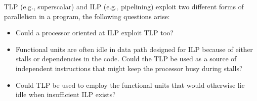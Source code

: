 TLP (e.g., superscalar) and ILP (e.g., pipelining) exploit two different forms of parallelism in a program, the
following questions arise:
\begin{itemize}
    \item Could a processor oriented at ILP exploit TLP too?
    \item Functional units are often idle in data path designed for ILP because of either stalls or dependencies in
    the code.
    Could the TLP be used as a source of independent instructions that might keep the processor busy during stalls?
    \item Could TLP be used to employ the functional units that would otherwise lie idle when insufficient ILP exists?
\end{itemize}